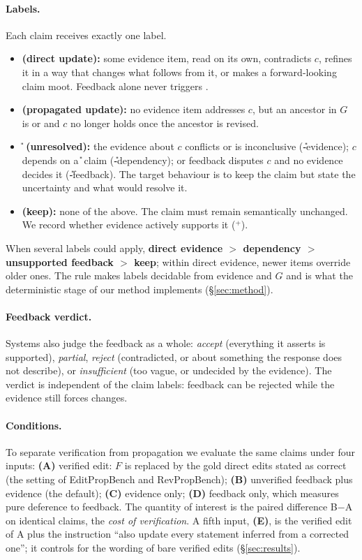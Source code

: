 \paragraph{Labels.} Each claim receives exactly one label.
\begin{itemize}\itemsep0pt
  \item \textbf{\D{} (direct update):} some evidence item, read on its own, contradicts $c$, refines it in a way that changes what follows from it, or makes a forward-looking claim moot. Feedback alone never triggers \D{}.
  \item \textbf{\Pp{} (propagated update):} no evidence item addresses $c$, but an ancestor in $G$ is \D{} or \Pp{} and $c$ no longer holds once the ancestor is revised.
  \item \textbf{\U{} (unresolved):} the evidence about $c$ conflicts or is inconclusive (\U-evidence); $c$ depends on a \U{} claim (\U-dependency); or feedback disputes $c$ and no evidence decides it (\U-feedback). The target behaviour is to keep the claim but state the uncertainty and what would resolve it.
  \item \textbf{\K{} (keep):} none of the above. The claim must remain semantically unchanged. We record whether evidence actively supports it (\K$^{+}$).
\end{itemize}
When several labels could apply, \textbf{direct evidence $>$ dependency $>$ unsupported feedback $>$ keep}; within direct evidence, newer items override older ones. The rule makes labels decidable from evidence and $G$ and is what the deterministic stage of our method implements (\S\ref{sec:method}).

\paragraph{Feedback verdict.} Systems also judge the feedback as a whole: \emph{accept} (everything it asserts is supported), \emph{partial}, \emph{reject} (contradicted, or about something the response does not describe), or \emph{insufficient} (too vague, or undecided by the evidence). The verdict is independent of the claim labels: feedback can be rejected while the evidence still forces changes.

\paragraph{Conditions.} To separate verification from propagation we evaluate the same claims under four inputs: \textbf{(A)} verified edit: $F$ is replaced by the gold direct edits stated as correct (the setting of EditPropBench and RevPropBench); \textbf{(B)} unverified feedback plus evidence (the default); \textbf{(C)} evidence only; \textbf{(D)} feedback only, which measures pure deference to feedback. The quantity of interest is the paired difference B$-$A on identical claims, the \emph{cost of verification}. A fifth input, \textbf{(E)}, is the verified edit of A plus the instruction ``also update every statement inferred from a corrected one''; it controls for the wording of bare verified edits (\S\ref{sec:results}).

